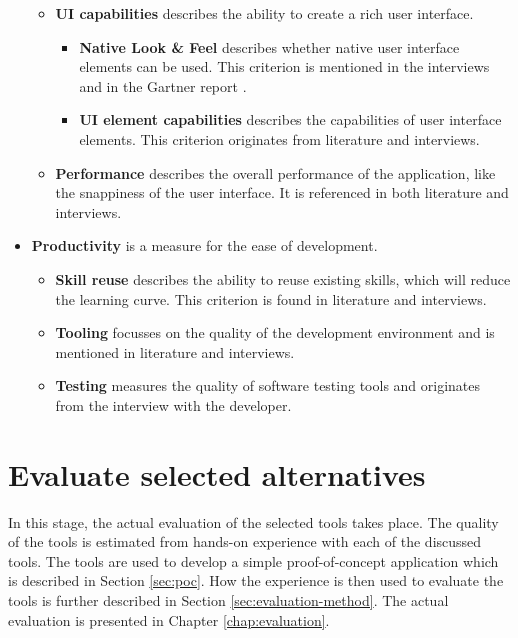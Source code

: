 \begin{itemize}
\begin{itemize}
\begin{itemize}
        \end{itemize}
        \item \textbf{UI capabilities} describes the ability to create a rich user interface. 
        \begin{itemize}
            \item \textbf{Native Look \& Feel} describes whether native user interface elements can be used. This criterion is mentioned in the interviews and in the Gartner report \cite{Gartner:CPT:2011}. 
            \item \textbf{UI element capabilities} describes the capabilities of user interface elements. This criterion originates from literature \cite{Gartner:CPT:2011, VMCPT:2012} and interviews.
        \end{itemize}
        \item \textbf{Performance} describes the overall performance of the application, like the snappiness of the user interface. It is referenced in both literature \cite{Gartner:CPT:2011, VMCPT:2012} and interviews.
    \end{itemize}
    \item \textbf{Productivity} is a measure for the ease of development.
    \begin{itemize}
        \item \textbf{Skill reuse} describes the ability to reuse existing skills, which will reduce the learning curve. This criterion is found in literature \cite{Gartner:CPT:2011, VMCPT:2012} and interviews.
        \item \textbf{Tooling} focusses on the quality of the development environment and is mentioned in literature \cite{Gartner:CPT:2011} and interviews.
        \item \textbf{Testing} measures the quality of software testing tools and originates from the interview with the developer.
    \end{itemize}
\end{itemize}

\section{Evaluate selected alternatives}

In this stage, the actual evaluation of the selected tools takes place. The quality of the tools is estimated from hands-on experience with each of the discussed tools. The tools are used to develop a simple proof-of-concept application which is described in Section \ref{sec:poc}. How the experience is then used to evaluate the tools is further described in Section \ref{sec:evaluation-method}. The actual evaluation is presented in Chapter \ref{chap:evaluation}.

